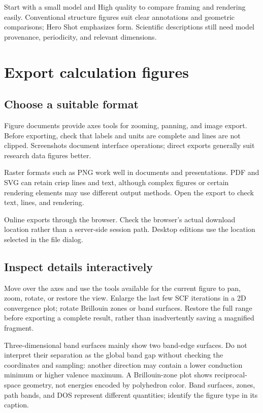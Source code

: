 Start with a small model and High quality to compare framing and rendering easily. Conventional structure figures suit clear annotations and geometric comparisons; Hero Shot emphasizes form. Scientific descriptions still need model provenance, periodicity, and relevant dimensions.

\section{Export calculation figures}

\subsection{Choose a suitable format}

Figure documents provide axes tools for zooming, panning, and image export. Before exporting, check that labels and units are complete and lines are not clipped. Screenshots document interface operations; direct exports generally suit research data figures better.

Raster formats such as PNG work well in documents and presentations. PDF and SVG can retain crisp lines and text, although complex figures or certain rendering elements may use different output methods. Open the export to check text, lines, and rendering.

Online exports through the browser. Check the browser's actual download location rather than a server-side session path. Desktop editions use the location selected in the file dialog.

\subsection{Inspect details interactively}

Move over the axes and use the tools available for the current figure to pan, zoom, rotate, or restore the view. Enlarge the last few SCF iterations in a 2D convergence plot; rotate Brillouin zones or band surfaces. Restore the full range before exporting a complete result, rather than inadvertently saving a magnified fragment.

Three-dimensional band surfaces mainly show two band-edge surfaces. Do not interpret their separation as the global band gap without checking the coordinates and sampling: another direction may contain a lower conduction minimum or higher valence maximum. A Brillouin-zone plot shows reciprocal-space geometry, not energies encoded by polyhedron color. Band surfaces, zones, path bands, and DOS represent different quantities; identify the figure type in its caption.

